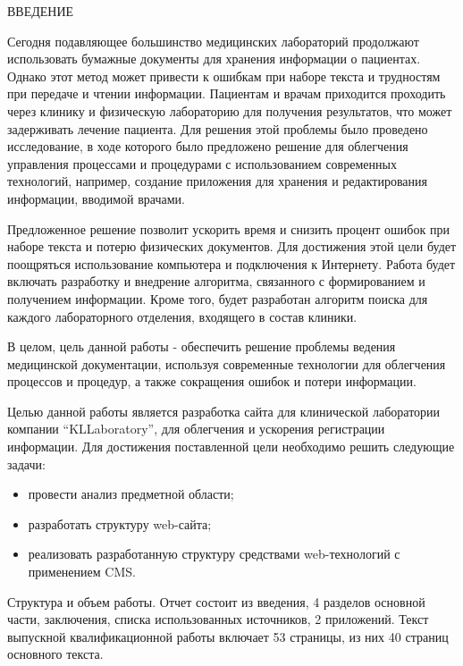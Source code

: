\newpage
\begin{center}ВВЕДЕНИЕ\end{center}


Сегодня подавляющее большинство медицинских лабораторий продолжают использовать бумажные документы для хранения информации о пациентах. Однако этот метод может привести к ошибкам при наборе текста и трудностям при передаче и чтении информации. Пациентам и врачам приходится проходить через клинику и физическую лабораторию для получения результатов, что может задерживать лечение пациента. Для решения этой проблемы было проведено исследование, в ходе которого было предложено решение для облегчения управления процессами и процедурами с использованием современных технологий, например, создание приложения для хранения и редактирования информации, вводимой врачами.

Предложенное решение позволит ускорить время и снизить процент ошибок при наборе текста и потерю физических документов. Для достижения этой цели будет поощряться использование компьютера и подключения к Интернету. Работа будет включать разработку и внедрение алгоритма, связанного с формированием и получением информации. Кроме того, будет разработан алгоритм поиска для каждого лабораторного отделения, входящего в состав клиники.

В целом, цель данной работы - обеспечить решение проблемы ведения медицинской документации, используя современные технологии для облегчения процессов и процедур, а также сокращения ошибок и потери информации.

Целью данной работы является разработка сайта для клинической лаборатории компании ``KLLaboratory'', для облегчения и ускорения регистрации информации. Для достижения поставленной цели необходимо решить следующие задачи:
\begin{itemize}
\item провести анализ предметной области;
\item разработать структуру web-сайта;
\item реализовать разработанную структуру средствами web-технологий с \linebreak применением CMS.
\end{itemize}

Структура и объем работы. Отчет состоит из введения, 4 разделов основной части, заключения, списка использованных источников, 2 приложений. Текст выпускной квалификационной работы включает 53 страницы, из них 40 страниц основного текста.

